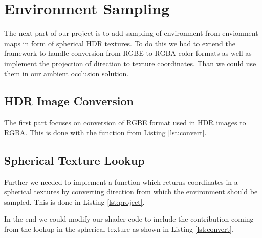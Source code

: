 
\section{Environment Sampling}
The next part of our project is to add sampling of environment from envionment maps in form of spherical HDR textures. To do this we had to extend the framework to handle conversion from RGBE to RGBA color formats as well as implement the projection of direction to texture coordinates. Than we could use them in our ambient occlusion solution.

\subsection{HDR Image Conversion}
The first part focuses on conversion of RGBE format used in HDR images to RGBA. This is done with the function from Listing \autoref{lst:convert}.


\subsection{Spherical Texture Lookup}
Further we needed to implement a function which returns coordinates in a spherical textures by converting direction from which the environment should be sampled. This is done in Listing \autoref{lst:project}.


In the end we could modify our shader code to include the contribution coming from the lookup in the spherical texture as shown in Listing \autoref{lst:convert}.


